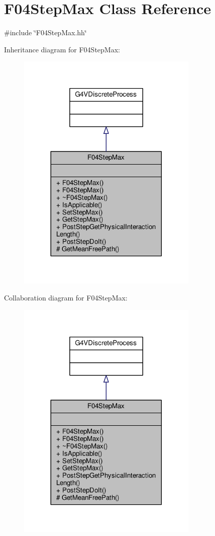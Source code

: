 \hypertarget{classF04StepMax}{}\section{F04\+Step\+Max Class Reference}
\label{classF04StepMax}


{\ttfamily \#include \char`\"{}F04\+Step\+Max.\+hh\char`\"{}}



Inheritance diagram for F04\+Step\+Max\+:
\nopagebreak
\begin{figure}[H]
\begin{center}
\leavevmode
\includegraphics[width=245pt]{classF04StepMax__inherit__graph}
\end{center}
\end{figure}


Collaboration diagram for F04\+Step\+Max\+:
\nopagebreak
\begin{figure}[H]
\begin{center}
\leavevmode
\includegraphics[width=245pt]{classF04StepMax__coll__graph}
\end{center}
\end{figure}
